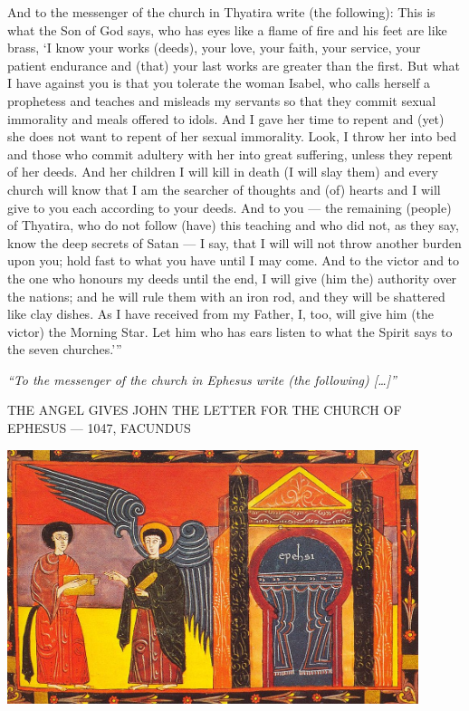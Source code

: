\begin{pages}
\begin{Leftside}
		\pend
		\pstart
			And to the messenger of the church in Thyatira write (the following): This is what the Son of God says, who has eyes like a flame of fire and his feet are like brass, ‘I know your works (deeds), your love, your faith, your service, your patient endurance and (that) your last works are greater than the first.
		\pend
		\pstart
			But what I have against you is that you tolerate the woman Isabel, who calls herself a prophetess and teaches and misleads my servants so that they commit sexual immorality and meals offered to idols. And I gave her time to repent and (yet) she does not want to repent of her sexual immorality. 
		\pend	
		\pstart
			Look, I throw her into bed and those who commit adultery with her into great suffering, unless they repent of her deeds. And her children I will kill in death (I will slay them) and every church will know that I am the searcher of thoughts and (of) hearts and I will give to you each according to your deeds. And to you — the remaining (people) of Thyatira, who do not follow (have) this teaching and who did not, as they say, know the deep secrets of Satan — I say, that I will will not throw another burden upon you; hold fast to what you have until I may come. And to the victor and to the one who honours my deeds until the end, I will give (him the) authority over the nations; and he will rule them with an iron rod, and they will be shattered like clay dishes. As I have received from my Father, I, too, will give him (the victor) the Morning Star. Let him who has ears listen to what the Spirit says to the seven churches.’”
		\pend
        \endnumbering
    \end{Leftside}

\end{pages} 
\Pages

\clearpage
\thispagestyle{empty}
\null\vfill
\settowidth{}
\begin{center}
\parbox{\longest}{%
  \raggedright{\huge\itshape%
    ``To the messenger of the church in Ephesus write (the following) […]'' \par\bigskip
  }
  \raggedleft\Large\MakeUppercase{The Angel gives John the Letter for the Church of Ephesus — 1047, Facundus}\par%
}
\vfill\vfill
\clearpage\newpage
\end{center}
\newpage
\thispagestyle{empty}
\begin{center}
	\includegraphics[angle=90, width=0.9\textwidth]{images/illustrations/letterephesus.jpg}
\end{center}